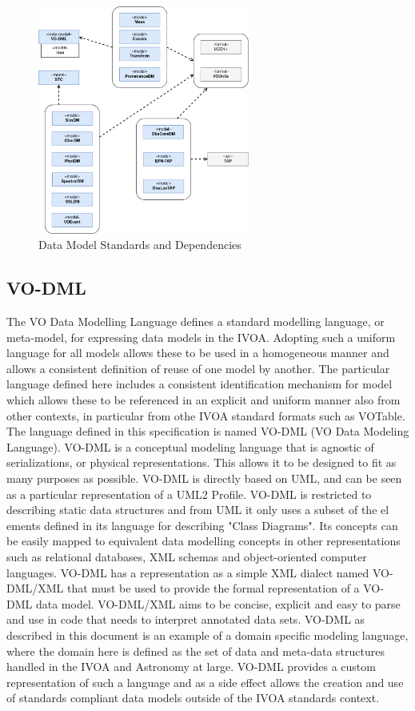 \documentclass[11pt,a4paper]{ivoa}
\begin{document}
\begin{figure}
\centering
\includegraphics[width=0.62\textwidth]{ivoa-arch-dm.png}
\caption{Data Model Standards and Dependencies}
\label{fig:dmdeps}
\end{figure}

\subsection{VO-DML}

The VO Data Modelling Language defines a standard modelling language, or meta-model, for 
expressing data models in the IVOA. Adopting such a uniform language for all models allows 
these to be used in a homogeneous manner and allows a consistent definition of reuse of one 
model by another. The particular language defined here includes a consistent identification 
mechanism for model which allows these to be referenced in an explicit and uniform manner 
also from other contexts, in particular from othe IVOA standard formats such as VOTable. 
The language defined in this specification is named VO-DML (VO Data Modeling Language). 
VO-DML is a conceptual modeling language that is agnostic of serializations, or physical 
representations. This allows it to be designed to fit as many purposes as possible. VO-DML 
is directly based on UML, and can be seen as a particular representation of a UML2 Profile. 
VO-DML is restricted to describing static data structures and from UML it only uses a subset 
of the el ements defined in its language for describing "Class Diagrams". Its concepts can 
be easily mapped to equivalent data modelling concepts in other representations such as 
relational databases, XML schemas and object-oriented computer languages. VO-DML has a 
representation as a simple XML dialect named VO-DML/XML that must be used to provide the 
formal representation of a VO-DML data model. VO-DML/XML aims to be concise, explicit and 
easy to parse and use in code that needs to interpret annotated data sets. VO-DML as 
described in this document is an example of a domain specific modeling language, where the 
domain here is defined as the set of data and meta-data structures handled in the IVOA and 
Astronomy at large. VO-DML provides a custom representation of such a language and as a 
side effect allows the creation and use of standards compliant data models outside of the 
IVOA standards context. 
\end{document}
